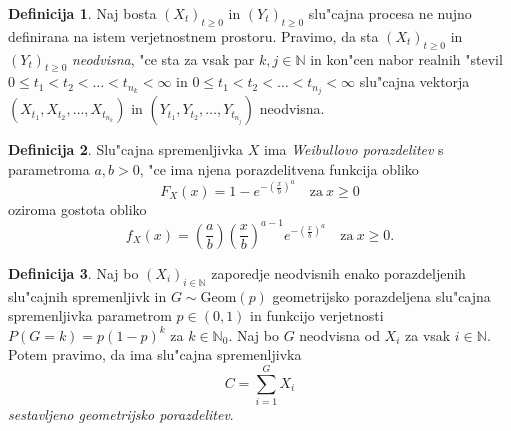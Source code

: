 \documentclass[12pt, a4paper, reqno]{amsart}
\theoremstyle{definition}
\newtheorem{definicija}{Definicija}[section]
\theoremstyle{plain}
\newcommand{\N}{\mathbb{N}}
\newcommand{\Prob}{\mathbb{P}}
\newcommand{\1}{\mathds{1}}
\begin{document}
    \begin{definicija}
        Naj bosta $(X_t)_{t\geq0}$ in $(Y_t)_{t\geq0}$ slu"cajna procesa ne nujno definirana na istem 
        verjetnostnem prostoru. Pravimo, da sta $(X_t)_{t\geq0}$ in $(Y_t)_{t\geq0}$ \textit{neodvisna}, 
        "ce sta za vsak par $k,j \in \N$ in kon"cen nabor realnih "stevil $0 \leq t_1 < t_2 < \ldots < t_{n_k} < \infty$ in 
        $0 \leq t_1 < t_2 < \ldots < t_{n_j} < \infty$ slu"cajna 
        vektorja $(X_{t_1}, X_{t_2}, \ldots, X_{t_{n_k}})$ in $(Y_{t_1}, Y_{t_2}, \ldots, Y_{t_{n_j}})$ neodvisna.
        \label{def:neodvisnostSP}
    \end{definicija}


    \begin{definicija}
        Slu"cajna spremenljivka $X$ ima \textit{Weibullovo porazdelitev} s parametroma $a, b > 0$, 
        "ce ima njena porazdelitvena funkcija obliko 
        \begin{equation*}
            F_X(x) = 1 - e^{-\left(\tfrac{x}{b}\right)^a} \quad \text{za} \ x\geq 0
        \end{equation*}
        oziroma gostota obliko
        \begin{equation*}
            f_X(x) = \left(\frac{a}{b}\right)\left(\frac{x}{b}\right)^{a-1}e^{-\left(\tfrac{x}{b}\right)^a} \quad \text{za} \ x\geq 0.
        \end{equation*}
        \label{def:WeibullovaPorazdelitev}
    \end{definicija}

    \begin{definicija}
        Naj bo $(X_i)_{i\in\N}$ zaporedje neodvisnih enako porazdeljenih slu"cajnih spremenljivk in 
        $G \sim \text{Geom}(p)$ geometrijsko porazdeljena slu"cajna spremenljivka  parametrom $p\in(0, 1)$ in 
        funkcijo verjetnosti $P(G = k) = p(1 - p)^{k}$ za $k\in\N_0$.
        Naj bo $G$ neodvisna od $X_i$ za vsak $i\in\N$. Potem pravimo, da ima slu"cajna spremenljivka
        \begin{equation*}
            C = \sum_{i= 1}^{G} X_i
        \end{equation*}
        \textit{sestavljeno geometrijsko porazdelitev}.
        \label{def:CompoundGeometricDistribution}
    \end{definicija}
\end{document}
